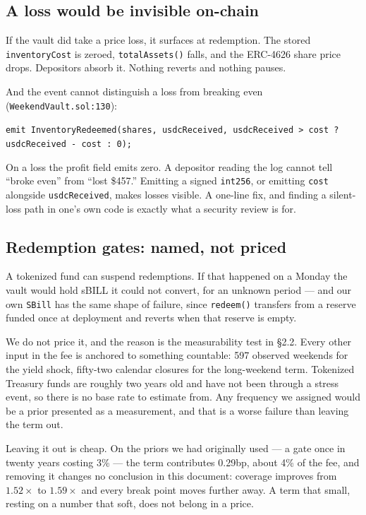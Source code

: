 \documentclass[11pt,a4paper]{article}
\begin{document}
\subsection{A loss would be invisible on-chain}

\begin{sloppypar}
If the vault did take a price loss, it surfaces at redemption. The stored
\texttt{inventoryCost} is zeroed, \texttt{totalAssets()} falls, and the ERC-4626
share price drops. Depositors absorb it. Nothing reverts and nothing pauses.
\end{sloppypar}

And the event cannot distinguish a loss from breaking even
(\texttt{WeekendVault.sol:130}):

\begin{center}
\small\texttt{emit InventoryRedeemed(shares, usdcReceived, usdcReceived > cost ? usdcReceived - cost : 0);}
\end{center}

On a loss the profit field emits zero. A depositor reading the log cannot tell ``broke
even'' from ``lost \$457.'' Emitting a signed \texttt{int256}, or emitting \texttt{cost}
alongside \texttt{usdcReceived}, makes losses visible. A one-line fix, and finding a
silent-loss path in one's own code is exactly what a security review is for.

\subsection{Redemption gates: named, not priced}
\label{sec:unpriced}

A tokenized fund can suspend redemptions. If that happened on a Monday the vault would
hold sBILL it could not convert, for an unknown period — and our own \texttt{SBill} has
the same shape of failure, since \texttt{redeem()} transfers from a reserve funded once at
deployment and reverts when that reserve is empty.

We do not price it, and the reason is the measurability test in \S2.2. Every other input
in the fee is anchored to something countable: 597 observed weekends for the yield shock,
fifty-two calendar closures for the long-weekend term. Tokenized Treasury funds are
roughly two years old and have not been through a stress event, so there is no base rate
to estimate from. Any frequency we assigned would be a prior presented as a measurement,
and that is a worse failure than leaving the term out.

Leaving it out is cheap. On the priors we had originally used — a gate once in twenty
years costing 3\% — the term contributes 0.29bp, about 4\% of the fee, and removing it
changes no conclusion in this document: coverage improves from $1.52\times$ to
$1.59\times$ and every break point moves further away. A term that small, resting on a
number that soft, does not belong in a price.
\end{document}
